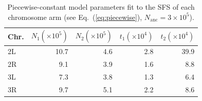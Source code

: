 \documentclass[11pt, letterpaper]{article}   	%
\newcommand{\eq}[1]{Eq.~(\ref{#1})}
\begin{document}
\begin{table}[h!]
  \begin{center}
    \caption{Piecewise-constant model parameters fit to the SFS of each chromosome arm (see \eq{eq:piecewise}, $N_{\text{anc}}=3 \times 10^5$).}
    \label{tab:DPGP_params}
    \begin{tabular}{l|r|r|r|r} %
        \textbf{Chr.} & \textbf{$N_1 (\times 10^5)$} & \textbf{$N_2 (\times 10^5)$} & \textbf{$t_1 (\times 10^4)$} & \textbf{$t_2 (\times 10^4)$}\\
        \hline
        2L & 10.7 & 4.6 & 2.8 & 39.9 \\
        2R &  9.1 & 3.9 & 1.6 &  8.8 \\
        3L &  7.3 & 3.8 & 1.3 &  6.4 \\
        3R &  9.7 & 5.1 & 2.2 &  8.6
    \end{tabular}
  \end{center}
\end{table}
\end{document}
